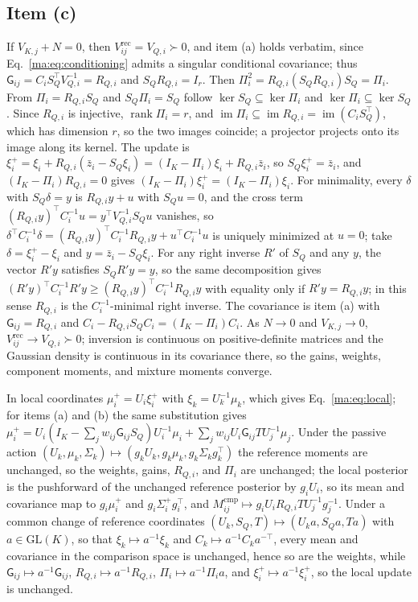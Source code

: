 \documentclass[11pt]{article}
\theoremstyle{definition}
\theoremstyle{remark}
\providecommand{\GL}{\mathrm{GL}}
\newcommand{\Vrec}{V^{\mathrm{rec}}}
\newcommand{\G}{\mathsf G}
\newcommand{\Mcmp}{M^{\mathrm{cmp}}}
\newcommand{\im}{\operatorname{im}}
\newcommand{\rank}{\operatorname{rank}}
\begin{document}
\subsection{Item (c)}
\label{ma:app:item3}

If $V_{K,j}+N=0$, then $\Vrec_{ij}=V_{Q,i}\succ0$, and item (a) holds verbatim, since Eq.~\eqref{ma:eq:conditioning} admits a singular conditional covariance; thus $\G_{ij}=C_iS_Q^\top V_{Q,i}^{-1}=R_{Q,i}$ and $S_QR_{Q,i}=I_r$. Then $\Pi_i^2=R_{Q,i}(S_QR_{Q,i})S_Q=\Pi_i$. From $\Pi_i=R_{Q,i}S_Q$ and $S_Q\Pi_i=S_Q$ follow $\ker S_Q\subseteq\ker\Pi_i$ and $\ker\Pi_i\subseteq\ker S_Q$. Since $R_{Q,i}$ is injective, $\rank\Pi_i=r$, and $\im\Pi_i\subseteq\im R_{Q,i}=\im(C_iS_Q^\top)$, which has dimension $r$, so the two images coincide; a projector projects onto its image along its kernel. The update is $\xi_i^+=\xi_i+R_{Q,i}(\bar z_i-S_Q\xi_i)=(I_K-\Pi_i)\xi_i+R_{Q,i}\bar z_i$, so $S_Q\xi_i^+=\bar z_i$, and $(I_K-\Pi_i)R_{Q,i}=0$ gives $(I_K-\Pi_i)\xi_i^+=(I_K-\Pi_i)\xi_i$. For minimality, every $\delta$ with $S_Q\delta=y$ is $R_{Q,i}y+u$ with $S_Qu=0$, and the cross term $(R_{Q,i}y)^\top C_i^{-1}u=y^\top V_{Q,i}^{-1}S_Qu$ vanishes, so $\delta^\top C_i^{-1}\delta=(R_{Q,i}y)^\top C_i^{-1}R_{Q,i}y+u^\top C_i^{-1}u$ is uniquely minimized at $u=0$; take $\delta=\xi_i^+-\xi_i$ and $y=\bar z_i-S_Q\xi_i$. For any right inverse $R'$ of $S_Q$ and any $y$, the vector $R'y$ satisfies $S_QR'y=y$, so the same decomposition gives $(R'y)^\top C_i^{-1}R'y\ge(R_{Q,i}y)^\top C_i^{-1}R_{Q,i}y$ with equality only if $R'y=R_{Q,i}y$; in this sense $R_{Q,i}$ is the $C_i^{-1}$-minimal right inverse. The covariance is item (a) with $\G_{ij}=R_{Q,i}$ and $C_i-R_{Q,i}S_QC_i=(I_K-\Pi_i)C_i$. As $N\to0$ and $V_{K,j}\to0$, $\Vrec_{ij}\to V_{Q,i}\succ0$; inversion is continuous on positive-definite matrices and the Gaussian density is continuous in its covariance there, so the gains, weights, component moments, and mixture moments converge.

In local coordinates $\mu_i^+=U_i\xi_i^+$ with $\xi_k=U_k^{-1}\mu_k$, which gives Eq.~\eqref{ma:eq:local}; for items (a) and (b) the same substitution gives $\mu_i^+=U_i(I_K-\sum_jw_{ij}\G_{ij}S_Q)U_i^{-1}\mu_i+\sum_jw_{ij}U_i\G_{ij}TU_j^{-1}\mu_j$. Under the passive action $(U_k,\mu_k,\Sigma_k)\mapsto(g_kU_k,g_k\mu_k,g_k\Sigma_kg_k^\top)$ the reference moments are unchanged, so the weights, gains, $R_{Q,i}$, and $\Pi_i$ are unchanged; the local posterior is the pushforward of the unchanged reference posterior by $g_iU_i$, so its mean and covariance map to $g_i\mu_i^+$ and $g_i\Sigma_i^+g_i^\top$, and $\Mcmp_{ij}\mapsto g_iU_iR_{Q,i}TU_j^{-1}g_j^{-1}$. Under a common change of reference coordinates $(U_k,S_Q,T)\mapsto(U_ka,S_Qa,Ta)$ with $a\in\GL(K)$, so that $\xi_k\mapsto a^{-1}\xi_k$ and $C_k\mapsto a^{-1}C_ka^{-\top}$, every mean and covariance in the comparison space is unchanged, hence so are the weights, while $\G_{ij}\mapsto a^{-1}\G_{ij}$, $R_{Q,i}\mapsto a^{-1}R_{Q,i}$, $\Pi_i\mapsto a^{-1}\Pi_ia$, and $\xi_i^+\mapsto a^{-1}\xi_i^+$, so the local update is unchanged.
\end{document}
